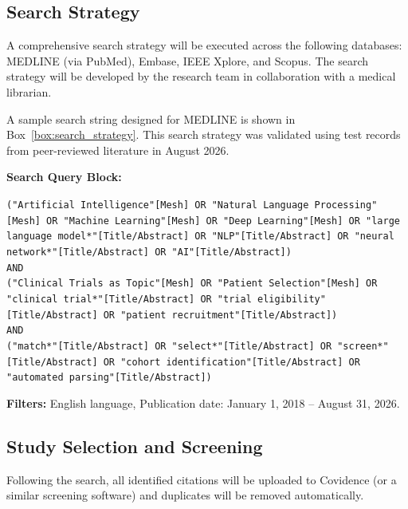 \subsection{Search Strategy}
A comprehensive search strategy will be executed across the following databases: MEDLINE (via PubMed), Embase, IEEE Xplore, and Scopus. The search strategy will be developed by the research team in collaboration with a medical librarian.

A sample search string designed for MEDLINE is shown in Box~\ref{box:search_strategy}. This search strategy was validated using test records from peer-reviewed literature in August 2026.

\begin{tcolorbox}[protocolbox, title={Box 2: Draft MEDLINE (PubMed) Search Strategy}, label=box:search_strategy]
\begin{minipage}{\textwidth}
\sffamily\small
\textbf{Search Query Block:}
\begin{tcolorbox}[searchbox]
\texttt{("Artificial Intelligence"[Mesh] OR "Natural Language Processing"[Mesh] OR "Machine Learning"[Mesh] OR "Deep Learning"[Mesh] OR "large language model*"[Title/Abstract] OR "NLP"[Title/Abstract] OR "neural network*"[Title/Abstract] OR "AI"[Title/Abstract])} \\{}
\texttt{AND} \\{}
\texttt{("Clinical Trials as Topic"[Mesh] OR "Patient Selection"[Mesh] OR "clinical trial*"[Title/Abstract] OR "trial eligibility"[Title/Abstract] OR "patient recruitment"[Title/Abstract])} \\{}
\texttt{AND} \\{}
\texttt{("match*"[Title/Abstract] OR "select*"[Title/Abstract] OR "screen*"[Title/Abstract] OR "cohort identification"[Title/Abstract] OR "automated parsing"[Title/Abstract])}
\end{tcolorbox}
\textbf{Filters:} English language, Publication date: January 1, 2018 -- August 31, 2026.
\end{minipage}
\end{tcolorbox}

\subsection{Study Selection and Screening}
Following the search, all identified citations will be uploaded to Covidence (or a similar screening software) and duplicates will be removed automatically. 

